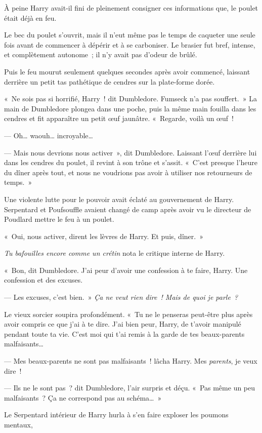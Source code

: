 À peine Harry avait-il fini de pleinement consigner ces informations que, le poulet était déjà en feu.

Le bec du poulet s'ouvrit, mais il n'eut même pas le temps de caqueter une seule fois avant de commencer à dépérir et à se carboniser.
Le brasier fut bref, intense, et complètement autonome~; il n'y avait pas d'odeur de brûlé.

Puis le feu mourut seulement quelques secondes après avoir commencé, laissant derrière un petit tas pathétique de cendres sur la plate-forme dorée.

«~Ne sois pas si horrifié, Harry~! dit Dumbledore.
Fumseck n'a pas souffert.~»
La main de Dumbledore plongea dans une poche, puis la même main fouilla dans les cendres et fit apparaître un petit œuf jaunâtre.
«~Regarde, voilà un œuf~!

--- Oh… waouh… incroyable…

--- Mais nous devrions nous activer~», dit Dumbledore.
Laissant l'œuf derrière lui dans les cendres du poulet, il revint à son trône et s'assit.
«~C'est presque l'heure du dîner après tout, et nous ne voudrions pas avoir à utiliser nos retourneurs de temps.~»

Une violente lutte pour le pouvoir avait éclaté au gouvernement de Harry.
Serpentard et Poufsouffle avaient changé de camp après avoir vu le directeur de Poudlard mettre le feu à un poulet.

«~Oui, nous activer, dirent les lèvres de Harry.
Et puis, dîner.~»

\emph{Tu bafouilles encore comme un crétin} nota le critique interne de Harry.

«~Bon, dit Dumbledore.
J'ai peur d'avoir une confession à te faire, Harry.
Une confession et des excuses.

--- Les excuses, c'est bien.~»
\emph{Ça ne veut rien dire~!
Mais de quoi je parle~?}

Le vieux sorcier soupira profondément.
«~Tu ne le penseras peut-être plus après avoir compris ce que j'ai à te dire.
J'ai bien peur, Harry, de t'avoir manipulé pendant toute ta vie.
C'est moi qui t'ai remis à la garde de tes beaux-parents malfaisants…

--- Mes beaux-parents ne sont pas malfaisants~! lâcha Harry.
Mes \emph{parents}, je veux dire~!

--- Ils ne le sont pas~? dit Dumbledore, l'air surpris et déçu.
«~Pas même un peu malfaisants~?
Ça ne correspond pas au schéma…~»

Le Serpentard intérieur de Harry hurla à s'en faire exploser les poumons mentaux, 

